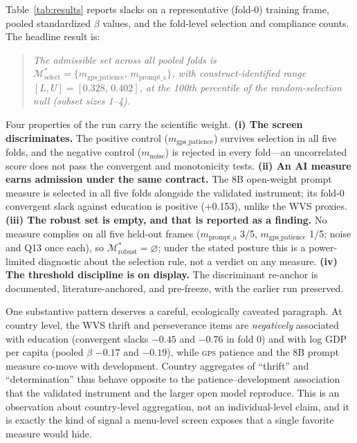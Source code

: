\documentclass[10pt,letterpaper]{article}
\newcommand{\GPS}{\textsc{gps}}
\newcommand{\M}{\ensuremath{\mathcal{M}}}
\begin{document}
Table~\ref{tab:results} reports slacks on a representative (fold-0) training frame, pooled standardized $\beta$ values, and the fold-level selection and compliance counts.
The headline result is:
\begin{quote}
\emph{The admissible set across all pooled folds is $\M^*_{\mathrm{select}}=\{m_{\mathrm{gps\_patience}},\,m_{\mathrm{prompt\_a}}\}$, with construct-identified range $[L,U]=[0.328,\,0.402]$, at the 100th percentile of the random-selection null (subset sizes 1--4).}
\end{quote}
Four properties of the run carry the scientific weight.
\textbf{(i) The screen discriminates.} The positive control ($m_{\mathrm{gps\_patience}}$) survives selection in all five folds, and the negative control ($m_{\mathrm{noise}}$) is rejected in every fold---an uncorrelated score does not pass the convergent and monotonicity tests.
\textbf{(ii) An AI measure earns admission under the same contract.} The 8B open-weight prompt measure is selected in all five folds alongside the validated instrument; its fold-0 convergent slack against education is positive (+0.153), unlike the WVS proxies.
\textbf{(iii) The robust set is empty, and that is reported as a finding.} No measure complies on all five held-out frames ($m_{\mathrm{prompt\_a}}$ 3/5, $m_{\mathrm{gps\_patience}}$ 1/5; noise and Q13 once each), so $\M^*_{\mathrm{robust}}=\varnothing$; under the stated posture this is a power-limited diagnostic about the selection rule, not a verdict on any measure.
\textbf{(iv) The threshold discipline is on display.} The discriminant re-anchor is documented, literature-anchored, and pre-freeze, with the earlier run preserved.

One substantive pattern deserves a careful, ecologically caveated paragraph.
At country level, the WVS thrift and perseverance items are \emph{negatively} associated with education (convergent slacks $-0.45$ and $-0.76$ in fold 0) and with log GDP per capita (pooled $\beta$ $-0.17$ and $-0.19$), while \GPS{} patience and the 8B prompt measure co-move with development.
Country aggregates of ``thrift'' and ``determination'' thus behave opposite to the patience--development association that the validated instrument and the larger open model reproduce.
This is an observation about country-level aggregation, not an individual-level claim, and it is exactly the kind of signal a menu-level screen exposes that a single favorite measure would hide.
\end{document}
